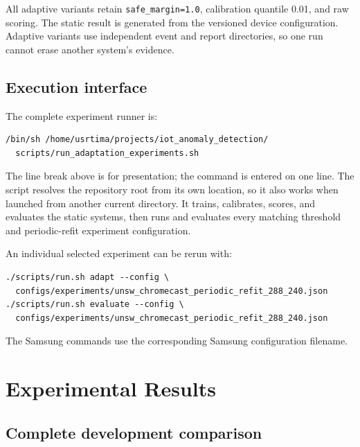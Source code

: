 \documentclass[11pt,a4paper]{article}
\begin{document}
All adaptive variants retain \texttt{safe\_margin=1.0}, calibration quantile
0.01, and raw scoring. The static result is generated from the versioned device
configuration. Adaptive variants use independent event and report directories,
so one run cannot erase another system's evidence.

\subsection{Execution interface}

The complete experiment runner is:

\begin{verbatim}
/bin/sh /home/usrtima/projects/iot_anomaly_detection/
  scripts/run_adaptation_experiments.sh
\end{verbatim}

The line break above is for presentation; the command is entered on one line.
The script resolves the repository root from its own location, so it also works
when launched from another current directory. It trains, calibrates, scores,
and evaluates the static systems, then runs and evaluates every matching
threshold and periodic-refit experiment configuration.

An individual selected experiment can be rerun with:

\begin{verbatim}
./scripts/run.sh adapt --config \
  configs/experiments/unsw_chromecast_periodic_refit_288_240.json
./scripts/run.sh evaluate --config \
  configs/experiments/unsw_chromecast_periodic_refit_288_240.json
\end{verbatim}

The Samsung commands use the corresponding Samsung configuration filename.

\section{Experimental Results}

\subsection{Complete development comparison}
\end{document}
